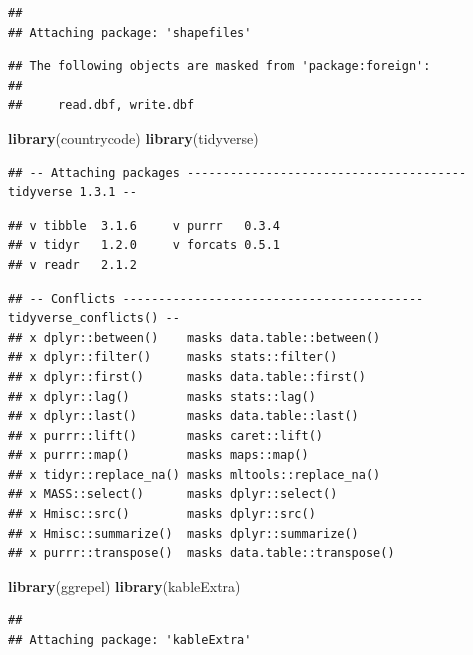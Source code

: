 \documentclass[]{article}
\newenvironment{Shaded}{\begin{snugshade}}{\end{snugshade}}
\newcommand{\KeywordTok}[1]{\textcolor[rgb]{0.13,0.29,0.53}{\textbf{#1}}}
\newcommand{\NormalTok}[1]{#1}
\begin{document}
\begin{verbatim}
## 
## Attaching package: 'shapefiles'
\end{verbatim}

\begin{verbatim}
## The following objects are masked from 'package:foreign':
## 
##     read.dbf, write.dbf
\end{verbatim}

\begin{Shaded}
\begin{Highlighting}[]
\KeywordTok{library}\NormalTok{(countrycode)}
\KeywordTok{library}\NormalTok{(tidyverse)}
\end{Highlighting}
\end{Shaded}

\begin{verbatim}
## -- Attaching packages --------------------------------------- tidyverse 1.3.1 --
\end{verbatim}

\begin{verbatim}
## v tibble  3.1.6     v purrr   0.3.4
## v tidyr   1.2.0     v forcats 0.5.1
## v readr   2.1.2
\end{verbatim}

\begin{verbatim}
## -- Conflicts ------------------------------------------ tidyverse_conflicts() --
## x dplyr::between()    masks data.table::between()
## x dplyr::filter()     masks stats::filter()
## x dplyr::first()      masks data.table::first()
## x dplyr::lag()        masks stats::lag()
## x dplyr::last()       masks data.table::last()
## x purrr::lift()       masks caret::lift()
## x purrr::map()        masks maps::map()
## x tidyr::replace_na() masks mltools::replace_na()
## x MASS::select()      masks dplyr::select()
## x Hmisc::src()        masks dplyr::src()
## x Hmisc::summarize()  masks dplyr::summarize()
## x purrr::transpose()  masks data.table::transpose()
\end{verbatim}

\begin{Shaded}
\begin{Highlighting}[]
\KeywordTok{library}\NormalTok{(ggrepel)}
\KeywordTok{library}\NormalTok{(kableExtra)}
\end{Highlighting}
\end{Shaded}

\begin{verbatim}
## 
## Attaching package: 'kableExtra'
\end{verbatim}
\end{document}
